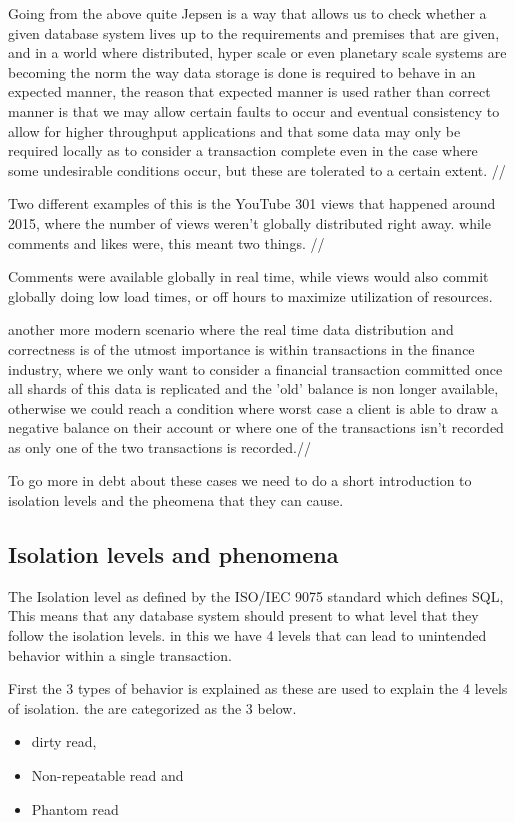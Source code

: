 \documentclass[
  a4paper,  %
  twoside,  %
  bibliography=totoc,
  headsepline,
  cleardoublepage=empty,
  parskip=half,
  draft=false
]{scrbook}
\begin{document}
Going from the above quite Jepsen is a way that allows us to check whether a given database system lives up to the requirements and premises that are given, and in a world where distributed, hyper scale or even planetary scale systems are becoming the norm the way data storage is done is required to behave in an expected manner, the reason that expected manner is used rather than correct manner is that we may allow certain faults to occur and eventual consistency to allow for higher throughput applications and that some data may only be required locally as to consider a transaction complete even in the case where some undesirable conditions occur, but these are tolerated to a certain extent. //

Two different examples of this is the YouTube 301 views that happened around 2015, where the number of views weren't globally distributed right away. while comments and likes were, this meant two things. //

Comments were available globally in real time, while views would also commit globally doing low load times, or off hours to maximize utilization of resources.

another more modern scenario where the real time data distribution and correctness is of the utmost importance is within transactions in the finance industry,  where we only want to consider a financial transaction committed once all shards of this data is replicated and the 'old' balance is non longer available, otherwise we could reach a condition where worst case a client is able to draw a negative balance on their account or where one of the transactions isn't recorded as only one of the two transactions is recorded.//

To go more in debt about these cases we need to do a short introduction to isolation levels and the pheomena that they can cause.


\subsection{Isolation levels and phenomena}

The Isolation level as defined by the ISO/IEC 9075 standard which defines SQL, This means that any database system should present to what level that they follow the isolation levels. in this we have 4 levels that can lead to unintended behavior within a single transaction. 

First the 3 types of behavior is explained as these are used to explain the 4 levels of isolation. the are categorized as the 3 below.
\begin{itemize}
\item dirty read,
\item Non-repeatable read and
\item Phantom read
\end{itemize}
\end{document}
